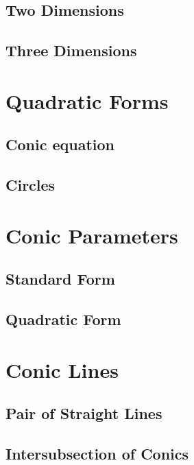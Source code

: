 \documentclass[journal,12pt,onecolumn]{IEEEtran}
\begin{document}
\subsection{Two Dimensions}

\subsection{Three Dimensions}

\section{Quadratic Forms}
\subsection{Conic equation }

\subsection{Circles}



\section{Conic Parameters}
\subsection{Standard Form}

\subsection{Quadratic Form }


\section{Conic Lines}
\subsection{Pair of Straight Lines}
%

\subsection{Intersubsection of Conics}

\end{document}
